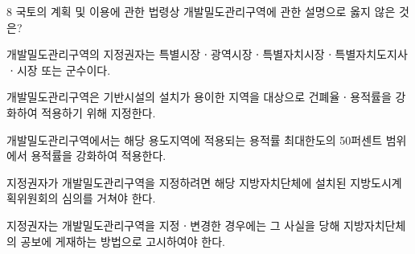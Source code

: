 \begin{question}{8}
국토의 계획 및 이용에 관한 법령상 개발밀도관리구역에 관한 설명으로 옳지 않은 것은?
\begin{choices}
  \item 개발밀도관리구역의 지정권자는 특별시장ㆍ광역시장ㆍ특별자치시장ㆍ특별자치도지사ㆍ시장 또는 군수이다.
  \item 개발밀도관리구역은 기반시설의 설치가 용이한 지역을 대상으로 건폐율ㆍ용적률을 강화하여 적용하기 위해 지정한다.
  \item 개발밀도관리구역에서는 해당 용도지역에 적용되는 용적률 최대한도의 50퍼센트 범위에서 용적률을 강화하여 적용한다.
  \item 지정권자가 개발밀도관리구역을 지정하려면 해당 지방자치단체에 설치된 지방도시계획위원회의 심의를 거쳐야 한다.
  \item 지정권자는 개발밀도관리구역을 지정ㆍ변경한 경우에는 그 사실을 당해 지방자치단체의 공보에 게재하는 방법으로 고시하여야 한다.
\end{choices}
\end{question}
